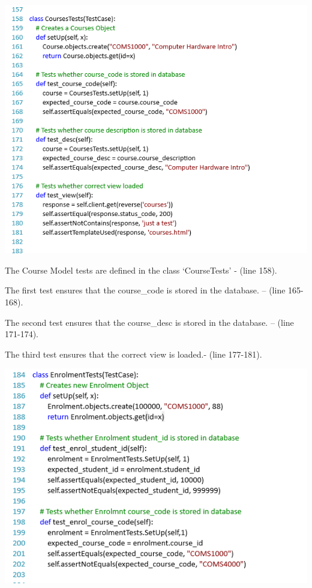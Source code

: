 \documentclass[10pt]{article}
\begin{document}
\begin{center}
\includegraphics[width=.9\textwidth]{pc1.png}
\end{center}

\begin{description}[font=$\bullet$~\normalfont\scshape\color{red!50!black}]

\item [] The Course Model tests are defined in the class ‘CourseTests’ - (line 158).
\item [] The first test ensures that the course\_code is stored in the database. – (line 165-168).
\item [] The second test ensures that the course\_desc is stored in the database. – (line 171-174).
\item [] The third test ensures that the correct view is loaded.- (line 177-181).
\end{description}

\begin{center}
\includegraphics[width=.9\textwidth]{pc2.png}
\end{center}
\end{document}

